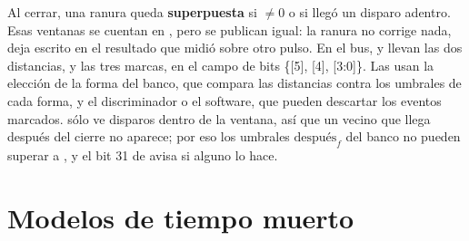 Al cerrar, una ranura queda \textbf{superpuesta} si  $\neq 0$ o si
llegó un disparo adentro. Esas ventanas se cuentan en , pero
se publican igual: la ranura no corrige nada, deja escrito en el resultado que
midió sobre otro pulso. En el bus,  y 
llevan las dos distancias, y  las tres marcas, en el campo de
bits \{[5], [4], [3:0]\}. Las usan
la elección de la forma del banco, que compara las distancias contra los
umbrales de cada forma, y el discriminador o el software, que pueden descartar
los eventos marcados.  sólo ve disparos dentro de la ventana,
así que un vecino que llega después del cierre no aparece; por eso los umbrales
$\text{después}_f$ del banco no pueden superar a , y el bit
31 de  avisa si alguno lo hace.

\section{Modelos de tiempo muerto}
\label{S:ap-mca-modelos}

